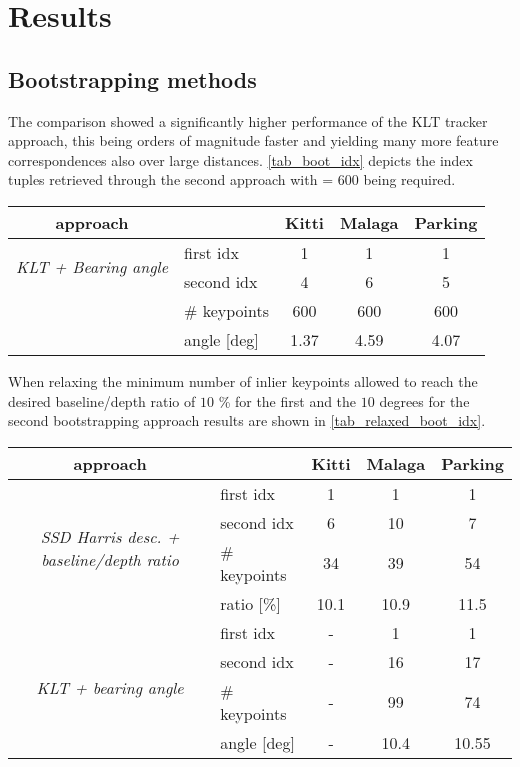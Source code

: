 \section{Results}

\subsection{Bootstrapping methods}
The comparison showed a significantly higher performance of the KLT tracker approach, this being orders of magnitude faster and yielding many more feature correspondences also over large distances. \cref{tab_boot_idx} depicts the index tuples retrieved through the second approach with  = $600$ being required.
\begin{center}
	\begin{tabular}{ c | l | c  c  c }
		approach &				 &				Kitti &		Malaga &	Parking\\
  		\hline
 \multirow{2}{*}{\textit{KLT + Bearing angle}} &	first idx &	1 & 		1 & 		1\\
  		 & 						second idx &	4 & 		6 & 		5\\
  		& 						\# keypoints & 				600 & 		600 & 		600\\
  		&						angle [deg] & 				1.37 &			4.59 &			4.07\\
  		\hline
	\end{tabular}
	\label{tab_boot_idx}
\end{center}

When relaxing the minimum number of inlier keypoints allowed to reach the desired baseline/depth ratio of $10$ \% for the first and the $10$ degrees for the second bootstrapping approach results are shown in \cref{tab_relaxed_boot_idx}.
\begin{center}
	\begin{tabular}{ c | l | c  c  c }
		approach &				 &				Kitti &		Malaga &	Parking\\
  		\hline
 \multirow{4}{*}{\textit{SSD Harris desc. + baseline/depth ratio}} 
 		&						first idx &			1 & 		1 & 		1\\
  		& 						second idx &		6 & 		10 & 		7\\
  		& 						\# keypoints & 		34 & 		39 & 		54\\
  		&						ratio [\%] & 		10.1 &		10.9 &		11.5\\
  		\hline
  \multirow{4}{*}{\textit{KLT + bearing angle}} 
  		&						first idx &			- & 		1 & 		1\\
  		& 						second idx &		- & 		16 & 		17\\
  		& 						\# keypoints & 		- & 		99 & 		74\\
  		&						angle [deg] & 		- &			10.4 &		10.55\\
  		\hline
	\end{tabular}
	\label{tab_relaxed_boot_idx}
\end{center}

